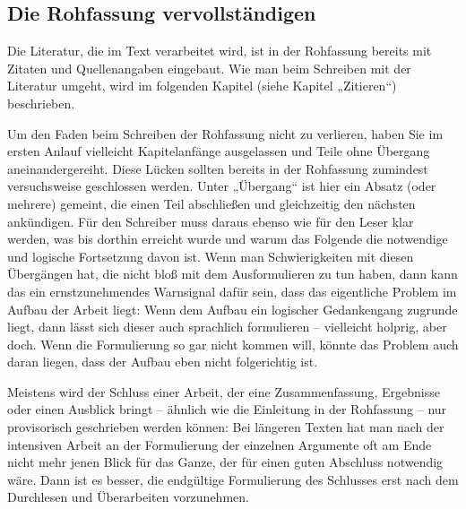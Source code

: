 \documentclass[]{book}
\theoremstyle{definition}
\theoremstyle{definition}
\theoremstyle{definition}
\theoremstyle{remark}
\begin{document}
\subsection{Die Rohfassung
vervollständigen}\label{die-rohfassung-vervollstandigen}

Die Literatur, die im Text verarbeitet wird, ist in der Rohfassung
bereits mit Zitaten und Quellenangaben eingebaut. Wie man beim Schreiben
mit der Literatur umgeht, wird im folgenden Kapitel (siehe Kapitel
„Zitieren``) beschrieben.

Um den Faden beim Schreiben der Rohfassung nicht zu verlieren, haben Sie
im ersten Anlauf vielleicht Kapitelanfänge ausgelassen und Teile ohne
Übergang aneinandergereiht. Diese Lücken sollten bereits in der
Rohfassung zumindest versuchsweise geschlossen werden. Unter „Übergang``
ist hier ein Absatz (oder mehrere) gemeint, die einen Teil abschließen
und gleichzeitig den nächsten ankündigen. Für den Schreiber muss daraus
ebenso wie für den Leser klar werden, was bis dorthin erreicht wurde und
warum das Folgende die notwendige und logische Fortsetzung davon ist.
Wenn man Schwierigkeiten mit diesen Übergängen hat, die nicht bloß mit
dem Ausformulieren zu tun haben, dann kann das ein ernstzunehmendes
Warnsignal dafür sein, dass das eigentliche Problem im Aufbau der Arbeit
liegt: Wenn dem Aufbau ein logischer Gedankengang zugrunde liegt, dann
lässt sich dieser auch sprachlich formulieren -- vielleicht holprig,
aber doch. Wenn die Formulierung so gar nicht kommen will, könnte das
Problem auch daran liegen, dass der Aufbau eben nicht folgerichtig ist.

Meistens wird der Schluss einer Arbeit, der eine Zusammenfassung,
Ergebnisse oder einen Ausblick bringt -- ähnlich wie die Einleitung in
der Rohfassung -- nur provisorisch geschrieben werden können: Bei
längeren Texten hat man nach der intensiven Arbeit an der Formulierung
der einzelnen Argumente oft am Ende nicht mehr jenen Blick für das
Ganze, der für einen guten Abschluss notwendig wäre. Dann ist es besser,
die endgültige Formulierung des Schlusses erst nach dem Durchlesen und
Überarbeiten vorzunehmen.
\end{document}

